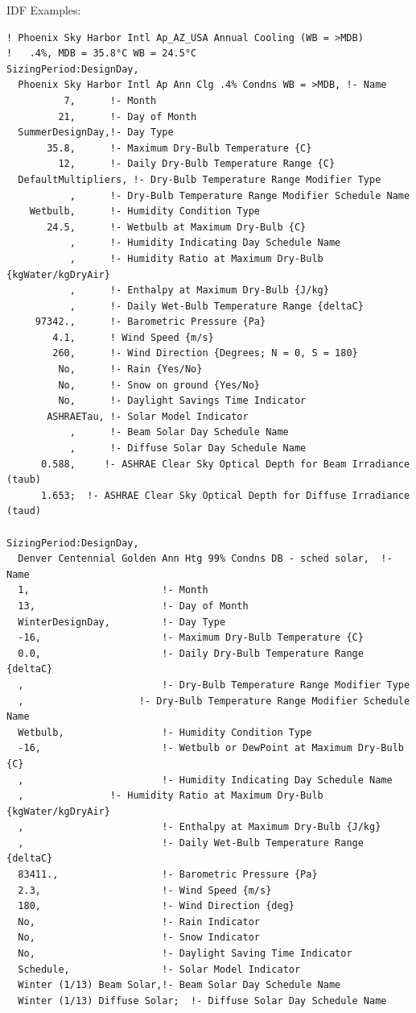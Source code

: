 IDF Examples:

\begin{lstlisting}
! Phoenix Sky Harbor Intl Ap_AZ_USA Annual Cooling (WB = >MDB)
!   .4%, MDB = 35.8°C WB = 24.5°C
SizingPeriod:DesignDay,
  Phoenix Sky Harbor Intl Ap Ann Clg .4% Condns WB = >MDB, !- Name
          7,      !- Month
         21,      !- Day of Month
  SummerDesignDay,!- Day Type
       35.8,      !- Maximum Dry-Bulb Temperature {C}
         12,      !- Daily Dry-Bulb Temperature Range {C}
  DefaultMultipliers, !- Dry-Bulb Temperature Range Modifier Type
           ,      !- Dry-Bulb Temperature Range Modifier Schedule Name
    Wetbulb,      !- Humidity Condition Type
       24.5,      !- Wetbulb at Maximum Dry-Bulb {C}
           ,      !- Humidity Indicating Day Schedule Name
           ,      !- Humidity Ratio at Maximum Dry-Bulb {kgWater/kgDryAir}
           ,      !- Enthalpy at Maximum Dry-Bulb {J/kg}
           ,      !- Daily Wet-Bulb Temperature Range {deltaC}
     97342.,      !- Barometric Pressure {Pa}
        4.1,      ! Wind Speed {m/s}
        260,      !- Wind Direction {Degrees; N = 0, S = 180}
         No,      !- Rain {Yes/No}
         No,      !- Snow on ground {Yes/No}
         No,      !- Daylight Savings Time Indicator
       ASHRAETau, !- Solar Model Indicator
           ,      !- Beam Solar Day Schedule Name
           ,      !- Diffuse Solar Day Schedule Name
      0.588,     !- ASHRAE Clear Sky Optical Depth for Beam Irradiance (taub)
      1.653;  !- ASHRAE Clear Sky Optical Depth for Diffuse Irradiance (taud)

SizingPeriod:DesignDay,
  Denver Centennial Golden Ann Htg 99% Condns DB - sched solar,  !- Name
  1,                       !- Month
  13,                      !- Day of Month
  WinterDesignDay,         !- Day Type
  -16,                     !- Maximum Dry-Bulb Temperature {C}
  0.0,                     !- Daily Dry-Bulb Temperature Range {deltaC}
  ,                        !- Dry-Bulb Temperature Range Modifier Type
  ,                    !- Dry-Bulb Temperature Range Modifier Schedule Name
  Wetbulb,                 !- Humidity Condition Type
  -16,                     !- Wetbulb or DewPoint at Maximum Dry-Bulb {C}
  ,                        !- Humidity Indicating Day Schedule Name
  ,               !- Humidity Ratio at Maximum Dry-Bulb {kgWater/kgDryAir}
  ,                        !- Enthalpy at Maximum Dry-Bulb {J/kg}
  ,                        !- Daily Wet-Bulb Temperature Range {deltaC}
  83411.,                  !- Barometric Pressure {Pa}
  2.3,                     !- Wind Speed {m/s}
  180,                     !- Wind Direction {deg}
  No,                      !- Rain Indicator
  No,                      !- Snow Indicator
  No,                      !- Daylight Saving Time Indicator
  Schedule,                !- Solar Model Indicator
  Winter (1/13) Beam Solar,!- Beam Solar Day Schedule Name
  Winter (1/13) Diffuse Solar;  !- Diffuse Solar Day Schedule Name


\end{lstlisting}
